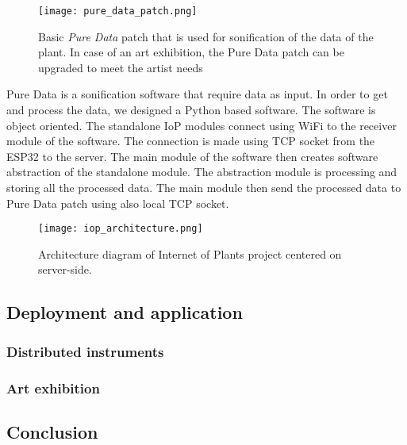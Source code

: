 \begin{figure}[h]
    \centering
    \texttt{[image: pure\_data\_patch.png]}
    \caption{Basic \textit{Pure Data} patch that is used for sonification of the data
    of the plant. In case of an art exhibition, the Pure Data patch can be upgraded to meet the
    artist needs} 
    \vspace{0.1cm}
    \label{fig:pure_data_patch}
\end{figure}


Pure Data is a sonification software that require data as input. In order to get and process the data,
we designed a Python based software.
The software is object oriented. The standalone IoP modules connect using WiFi to the receiver module
of the software. The connection is made using TCP socket from the ESP32 to the server.
The main module of the software then creates software abstraction of the standalone module. 
The abstraction module is processing and storing all the processed data.
The main module then send the processed data to Pure Data patch using also local TCP socket.

\begin{figure}[h]
    \centering
    \texttt{[image: iop\_architecture.png]}
    \caption{Architecture diagram of Internet of Plants project centered on server-side.} 
    \vspace{0.1cm}
    \label{fig:server_architecture}
\end{figure}


\subsection{Deployment and application}

\subsubsection{Distributed instruments}

\subsubsection{Art exhibition}

\subsection{Conclusion}


